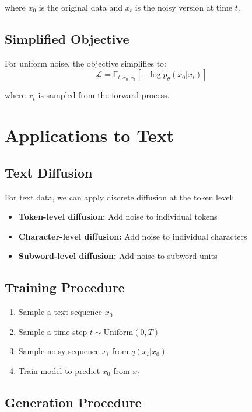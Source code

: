 where $x_0$ is the original data and $x_t$ is the noisy version at time $t$.

\subsection{Simplified Objective}

For uniform noise, the objective simplifies to:
\begin{equation}
    \mathcal{L} = \mathbb{E}_{t, x_0, x_t} [-\log p_\theta(x_0 | x_t)]
\end{equation}

where $x_t$ is sampled from the forward process.

\section{Applications to Text}

\subsection{Text Diffusion}

For text data, we can apply discrete diffusion at the token level:
\begin{itemize}
    \item \textbf{Token-level diffusion:} Add noise to individual tokens
    \item \textbf{Character-level diffusion:} Add noise to individual characters
    \item \textbf{Subword-level diffusion:} Add noise to subword units
\end{itemize}

\subsection{Training Procedure}

\begin{enumerate}
    \item Sample a text sequence $x_0$
    \item Sample a time step $t \sim \text{Uniform}(0, T)$
    \item Sample noisy sequence $x_t$ from $q(x_t | x_0)$
    \item Train model to predict $x_0$ from $x_t$
\end{enumerate}

\subsection{Generation Procedure}

